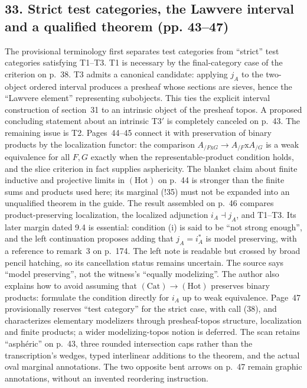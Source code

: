 \subsection*{33. Strict test categories, the Lawvere interval and a qualified theorem (pp. 43--47)}
The provisional terminology first separates test categories from ``strict'' test categories satisfying T1--T3. T1 is necessary by the final-category case of the criterion on p.~38. T3 admits a canonical candidate: applying $j_A$ to the two-object ordered interval produces a presheaf whose sections are sieves, hence the ``Lawvere element'' representing subobjects. This ties the explicit interval construction of section~31 to an intrinsic object of the presheaf topos. A proposed concluding statement about an intrinsic T3$'$ is completely canceled on p.~43. The remaining issue is T2. Pages~44--45 connect it with preservation of binary products by the localization functor: the comparison $A_{/F\mathrm{x}G}\to A_{/F}\mathrm{x}A_{/G}$ is a weak equivalence for all $F,G$ exactly when the representable-product condition holds, and the slice criterion in fact supplies asphericity. The blanket claim about finite inductive and projective limits in $(\mathrm{Hot})$ on p.~44 is stronger than the finite sums and products used here; its marginal (!35) must not be expanded into an unqualified theorem in the guide. The result assembled on p.~46 compares product-preserving localization, the localized adjunction $i_A\dashv j_A$, and T1--T3. Its later margin dated 9.4 is essential: condition (i) is said to be ``not strong enough'', and the left continuation proposes adding that $j_A=i_A^*$ is model preserving, with a reference to remark~3 on p.~174. The left note is readable but crossed by broad pencil hatching, so its cancellation status remains uncertain. The source says ``model preserving'', not the witness's ``equally modelizing''. The author also explains how to avoid assuming that $(\mathrm{Cat})\to(\mathrm{Hot})$ preserves binary products: formulate the condition directly for $i_A$ up to weak equivalence. Page~47 provisionally reserves ``test category'' for the strict case, with call (38), and characterizes elementary modelizers through presheaf-topos structure, localization and finite products; a wider modelizing-topos notion is deferred. The scan retains ``asphéric'' on p.~43, three rounded intersection caps rather than the transcription's wedges, typed interlinear additions to the theorem, and the actual oval marginal annotations. The two opposite bent arrows on p.~47 remain graphic annotations, without an invented reordering instruction.

